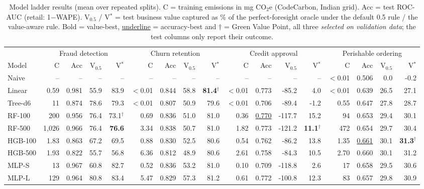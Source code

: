 \begin{table}[t]
\centering
\caption{Model ladder results (mean over repeated splits). C = training emissions in mg CO$_2$e (CodeCarbon, Indian grid). Acc = test ROC-AUC (retail: 1$-$WAPE). V$_{0.5}$ / V$^{\ast}$ = test business value captured as \% of the perfect-foresight oracle under the default 0.5 rule / the value-aware rule. Bold = value-best, \underline{underline} = accuracy-best and $\dagger$ = Green Value Point, all three \emph{selected on validation data}; the test columns only report their outcome.}
\label{tab:ladder}
\scriptsize
\setlength{\tabcolsep}{3.2pt}
\begin{tabular}{lrrrrrrrrrrrrrrrr}
\toprule
 & \multicolumn{4}{c}{Fraud detection} & \multicolumn{4}{c}{Churn retention} & \multicolumn{4}{c}{Credit approval} & \multicolumn{4}{c}{Perishable ordering} \\
\cmidrule(lr){2-5}\cmidrule(lr){6-9}\cmidrule(lr){10-13}\cmidrule(lr){14-17}
Model & C & Acc & V$_{0.5}$ & V$^{\ast}$ & C & Acc & V$_{0.5}$ & V$^{\ast}$ & C & Acc & V$_{0.5}$ & V$^{\ast}$ & C & Acc & V$_{0.5}$ & V$^{\ast}$ \\ \midrule
Naive & -- & -- & -- & -- & -- & -- & -- & -- & -- & -- & -- & -- & $<$0.01 & 0.506 & 0.0 & -0.2 \\
Linear & 0.59 & 0.981 & 55.9 & 83.9 & $<$0.01 & 0.844 & 58.8 & \textbf{81.4}$^\dagger$ & $<$0.01 & 0.773 & -85.2 & 4.0 & $<$0.01 & 0.639 & 26.5 & 27.1 \\
Tree-d6 & 11 & 0.874 & 78.6 & 79.3 & $<$0.01 & 0.807 & 50.9 & 79.6 & $<$0.01 & 0.706 & -89.4 & -1.2 & 0.55 & 0.647 & 27.8 & 28.7 \\
RF-100 & 200 & 0.956 & 76.4 & 73.1$^\dagger$ & 0.69 & 0.836 & 51.0 & 81.0 & 0.36 & \underline{0.770} & -117.7 & 15.2 & 94 & 0.653 & 29.4 & 30.1 \\
RF-500 & 1,026 & 0.966 & 76.4 & \textbf{76.6} & 3.34 & 0.838 & 50.7 & 81.0 & 1.82 & 0.773 & -121.2 & \textbf{11.1}$^\dagger$ & 472 & 0.654 & 29.7 & 30.4 \\
HGB-100 & 1.83 & 0.863 & 67.2 & 69.5 & 0.88 & 0.830 & 52.5 & 80.6 & 0.54 & 0.762 & -86.2 & 13.8 & 1.35 & \underline{0.661} & 30.1 & \textbf{31.3}$^\dagger$ \\
HGB-500 & 1.93 & 0.822 & 55.7 & 56.8 & 6.36 & 0.812 & 48.9 & 80.6 & 2.61 & 0.758 & -84.3 & 10.5 & 2.70 & 0.660 & 30.1 & 31.2 \\
MLP-S & 13 & 0.967 & 60.8 & 82.7 & 0.52 & 0.836 & 53.2 & 81.0 & 0.10 & 0.709 & -118.8 & 2.6 & 17 & 0.658 & 29.5 & 30.6 \\
MLP-L & 129 & 0.964 & 80.8 & 83.4 & 5.47 & 0.829 & 57.3 & 81.2 & 0.61 & 0.772 & -100.8 & 12.3 & 83 & 0.657 & 29.8 & 30.9 \\

\end{tabular}
\end{table}

